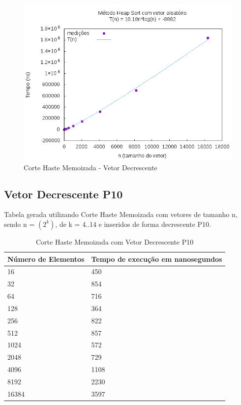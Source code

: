 \documentclass[12pt,a4paper,twoside]{report}
\begin{document}
\begin{figure}[H]
    \centering
    \includegraphics[width=0.7\linewidth]{graficos/HeapSort/vIntAleatorio/vIntAleatorio.png}
  \caption{Corte Haste Memoizada - Vetor Decrescente}
\end{figure}


\subsection{Vetor Decrescente P10}
Tabela gerada utilizando Corte Haste Memoizada com vetores de tamanho n, sendo n = $(2^k)$, de k = 4..14 e inseridos de forma decrescente P10.
\begin{table}[H]
\centering
\caption{Corte Haste Memoizada com Vetor Decrescente P10}
\label{my-label}
\begin{tabular}{|l|l|}
\hline
\multicolumn{1}{|c|}{\textbf{Número de Elementos}} & \multicolumn{1}{c|}{\textbf{Tempo de execução em nanosegundos}} \\ \hline
16 & 450 \\ \hline
32 & 854 \\ \hline
64 & 716 \\ \hline
128 & 364 \\ \hline
256 & 822 \\ \hline
512 & 857 \\ \hline
1024 & 572 \\ \hline
2048 & 729 \\ \hline
4096 & 1108 \\ \hline
8192 & 2230 \\ \hline
16384 & 3597 \\ \hline

\end{tabular}
\end{table}
\end{document}
